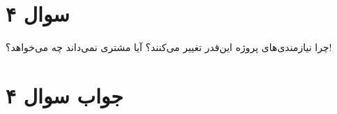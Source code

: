 \section*{سوال ۴}

چرا نیازمندی‌های پروژه این‌قدر تغییر می‌کنند؟ آیا مشتری نمی‌داند چه می‌خواهد؟!

\section*{جواب سوال ۴}


